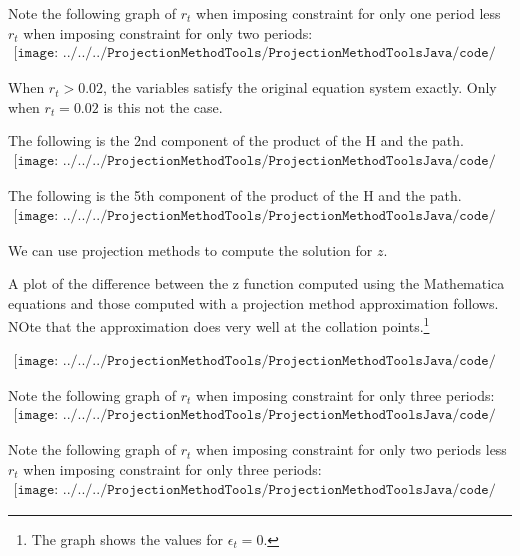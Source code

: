 \documentclass[12pt]{article}
\begin{document}




Note the following graph of $r_t$ when imposing constraint for only one period
less $r_t$ when imposing constraint for only two periods:
\begin{gather*}
\texttt{[image: ../../../ProjectionMethodTools/ProjectionMethodToolsJava/code/prettyrr01lessrr02.pdf]}
\end{gather*}


When $r_t>0.02$, the variables satisfy the original equation system exactly.
Only when $r_t=0.02$ is this not the case.


The following is the 2nd component of the product of the H and the path.
\begin{gather*}
\texttt{[image: ../../../ProjectionMethodTools/ProjectionMethodToolsJava/code/prettyhapp02A.pdf]}
\end{gather*}

The following is the 5th component of the product of the H and the path.
\begin{gather*}
\texttt{[image: ../../../ProjectionMethodTools/ProjectionMethodToolsJava/code/prettyhapp02B.pdf]}
\end{gather*}


We can use projection methods to compute the solution for $z$.

A plot of the difference between the z function computed using the Mathematica equations and those computed with a projection method approximation follows. NOte that the approximation does very well at the collation points.\footnote{The graph shows the values for $\epsilon_t=0$.}


\begin{gather*}
\texttt{[image: ../../../ProjectionMethodTools/ProjectionMethodToolsJava/code/prettyNumDiff02.pdf]}
\end{gather*}




Note the following graph of $r_t$ when imposing constraint for only three
 periods:
\begin{gather*}
\texttt{[image: ../../../ProjectionMethodTools/ProjectionMethodToolsJava/code/prettyrr03.pdf]}
\end{gather*}



Note the following graph of $r_t$ when imposing constraint for only two periods
less $r_t$ when imposing constraint for only three periods:
\begin{gather*}
\texttt{[image: ../../../ProjectionMethodTools/ProjectionMethodToolsJava/code/prettyrr02lessrr03.pdf]}
\end{gather*}
\end{document}

